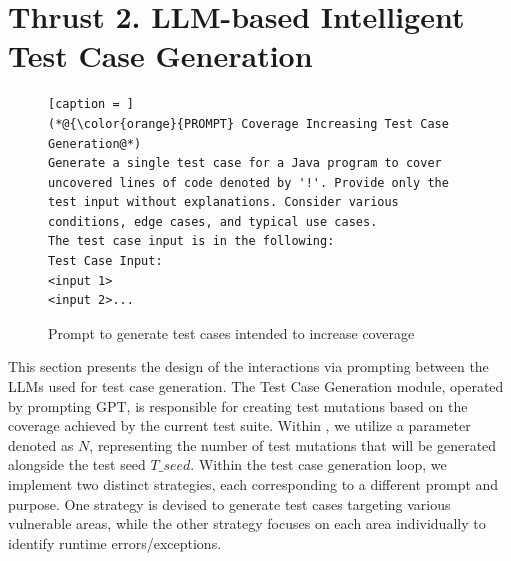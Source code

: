 \section{Thrust 2. LLM-based Intelligent Test Case Generation}
\label{sec:thrust2}





\begin{figure}
  \centering
\begin{lstlisting}[caption = ]
(*@{\color{orange}{PROMPT} Coverage Increasing Test Case Generation@*)
Generate a single test case for a Java program to cover uncovered lines of code denoted by '!'. Provide only the test input without explanations. Consider various conditions, edge cases, and typical use cases.
The test case input is in the following:
Test Case Input:
<input 1>
<input 2>...
\end{lstlisting}
\vspace{-6pt}
\caption{Prompt to generate test cases intended to increase coverage}
\label{fig:cov-prompt}
\end{figure}


This section presents the design of the interactions via prompting
between the LLMs used for test case generation.
The Test Case Generation module, operated by prompting GPT, is
responsible for creating test mutations based on the coverage achieved
by the current test suite. Within {\tool}, we utilize a parameter
denoted as $N$, representing the number of test mutations
that will be generated alongside the test seed $T\_seed$. Within the
test case generation loop,
we implement two distinct strategies, each corresponding to a
different prompt and purpose. One strategy is devised to generate test
cases targeting various vulnerable areas, while the other strategy
focuses on each area individually to identify runtime
errors/exceptions.

